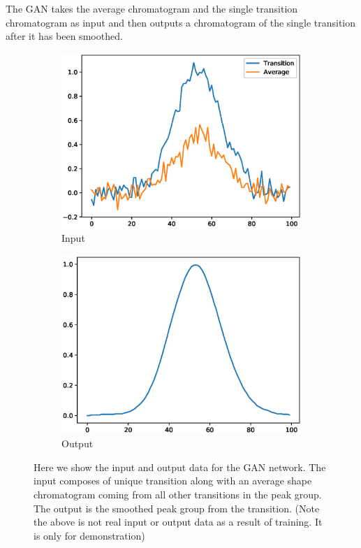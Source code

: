 \documentclass[12pt]{article}
\begin{document}
The GAN takes the average chromatogram and the single transition chromatogram as input and then outputs a chromatogram of the single transition after it has been smoothed. 

\begin{figure}
\centering
\begin{subfigure}{.5\textwidth}
  \centering
  \includegraphics[width=1\linewidth]{input}
  \caption{Input}
  \label{fig:sub1}
\end{subfigure}%
\begin{subfigure}{.5\textwidth}
  \centering
  \includegraphics[width=1\linewidth]{output}
  \caption{Output}
  \label{fig:sub2}
\end{subfigure}
\caption{Here we show the input and output data for the GAN network. The input composes of unique transition along with an average shape chromatogram coming from all other transitions in the peak group. The output is the smoothed peak group from the transition. (Note the above is not real input or output data as a result of training. It is only for demonstration)}
\label{fig:test}
\end{figure}
\end{document}
